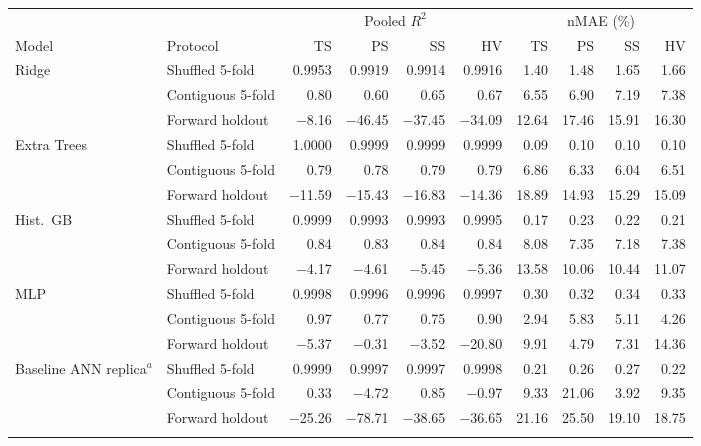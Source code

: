 \begin{tabular}{@{}llrrrrrrrr@{}}
\toprule
 & & \multicolumn{4}{c}{Pooled $R^2$} & \multicolumn{4}{c}{nMAE (\%)} \\
\cmidrule(lr){3-6}\cmidrule(l){7-10}
Model & Protocol & TS & PS & SS & HV & TS & PS & SS & HV \\
\midrule
Ridge & Shuffled 5-fold & 0.9953 & 0.9919 & 0.9914 & 0.9916 & 1.40 & 1.48 & 1.65 & 1.66 \\
 & Contiguous 5-fold & 0.80 & 0.60 & 0.65 & 0.67 & 6.55 & 6.90 & 7.19 & 7.38 \\
 & Forward holdout & $-$8.16 & $-$46.45 & $-$37.45 & $-$34.09 & 12.64 & 17.46 & 15.91 & 16.30 \\
\addlinespace[2pt]
Extra Trees & Shuffled 5-fold & 1.0000 & 0.9999 & 0.9999 & 0.9999 & 0.09 & 0.10 & 0.10 & 0.10 \\
 & Contiguous 5-fold & 0.79 & 0.78 & 0.79 & 0.79 & 6.86 & 6.33 & 6.04 & 6.51 \\
 & Forward holdout & $-$11.59 & $-$15.43 & $-$16.83 & $-$14.36 & 18.89 & 14.93 & 15.29 & 15.09 \\
\addlinespace[2pt]
Hist.\ GB & Shuffled 5-fold & 0.9999 & 0.9993 & 0.9993 & 0.9995 & 0.17 & 0.23 & 0.22 & 0.21 \\
 & Contiguous 5-fold & 0.84 & 0.83 & 0.84 & 0.84 & 8.08 & 7.35 & 7.18 & 7.38 \\
 & Forward holdout & $-$4.17 & $-$4.61 & $-$5.45 & $-$5.36 & 13.58 & 10.06 & 10.44 & 11.07 \\
\addlinespace[2pt]
MLP & Shuffled 5-fold & 0.9998 & 0.9996 & 0.9996 & 0.9997 & 0.30 & 0.32 & 0.34 & 0.33 \\
 & Contiguous 5-fold & 0.97 & 0.77 & 0.75 & 0.90 & 2.94 & 5.83 & 5.11 & 4.26 \\
 & Forward holdout & $-$5.37 & $-$0.31 & $-$3.52 & $-$20.80 & 9.91 & 4.79 & 7.31 & 14.36 \\
\addlinespace[2pt]
Baseline ANN replica$^{a}$ & Shuffled 5-fold & 0.9999 & 0.9997 & 0.9997 & 0.9998 & 0.21 & 0.26 & 0.27 & 0.22 \\
 & Contiguous 5-fold & 0.33 & $-$4.72 & 0.85 & $-$0.97 & 9.33 & 21.06 & 3.92 & 9.35 \\
 & Forward holdout & $-$25.26 & $-$78.71 & $-$38.65 & $-$36.65 & 21.16 & 25.50 & 19.10 & 18.75 \\
\addlinespace[2pt]
\bottomrule
\end{tabular}
